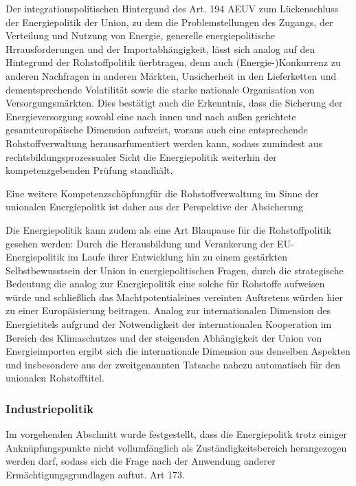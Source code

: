\documentclass[12pt,a4paper,oneside]{book} %
\begin{document}
	Der integrationspolitischen Hintergund des Art. 194 AEUV zum Lückenschluss der Energiepolitik der Union, zu dem die Problemstellungen des Zugangs, der Verteilung und Nutzung von Energie, generelle energiepolitische Hrrausforderungen und der Importabhängigkeit,\autocite[Nettesheim, Art. 194 Rn 10]{grabitz_recht_2024} lässt sich analog auf den Hintegrund der Rohstoffpolitik üerbtragen, denn auch (Energie-)Konkurrenz zu anderen Nachfragen in anderen Märkten, Unsicherheit in den Lieferketten und dementsprechende Volatilität sowie die starke nationale Organisation von Versorgungsmärkten.\autocite[Nettesheim, Art. 194 Rn 10]{grabitz_recht_2024} Dies bestätigt auch die Erkenntnis, dass die Sicherung der Energieversorgung sowohl eine nach innen und nach außen gerichtete gesamteuropäische Dimension aufweist, woraus auch eine entsprechende Rohstoffverwaltung herausarfumentiert werden kann, sodass zumindest aus rechtsbildungsprozessualer Sicht die Energiepolitik weiterhin der kompetenzgebenden Prüfung standhält.
	
	Eine weitere \glqq Kompetenzschöpfung\grqq für die Rohstoffverwaltung im Sinne der unionalen Energiepolitk ist daher aus der Perspektive der Absicherung 
	
	Die Energiepolitik kann zudem als eine Art Blaupause für die Rohstoffpolitik gesehen werden: Durch die Herausbildung und Verankerung der EU-Energiepolitik im Laufe ihrer Entwicklung hin zu einem gestärkten Selbstbewusstsein der Union in energiepolitischen Fragen, durch die strategische Bedeutung die analog zur Energiepolitik eine solche für Rohstoffe aufweisen würde und schließlich das \glqq Machtpotential\grqq eines vereinten Auftretens würden hier zu einer Europäisierung beitragen.\autocite[Nettesheim, Art. 194 Rn 44]{grabitz_recht_2024}	Analog zur internationalen Dimension des Energietitels aufgrund der Notwendigkeit der internationalen Kooperation im Bereich des Klimaschutzes und der steigenden Abhängigkeit der Union von Energieimporten\autocite{Gundel, Theobald/Kühling, Europäisches Energierecht, V. Rn. 86} ergibt sich die internationale Dimension aus denselben Aspekten und insbesondere aus der zweitgenannten Tatsache nahezu automatisch für den unionalen Rohstofftitel.
	
	\subsubsection{Industriepolitik}
	Im vorgehenden Abschnitt wurde festgestellt, dass die Energiepolitk trotz einiger Anknüpfungspunkte nicht vollumfänglich als Zuständigkeitsbereich herangezogen werden darf, sodass sich die Frage nach der Anwendung anderer Ermächtigungsgrundlagen auftut.
	Art 173.
	
\end{document}
